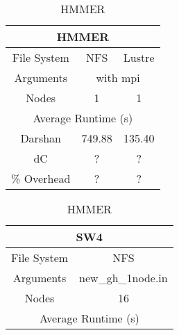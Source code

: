 \begin{table}[h]
    \begin{subtable}[h]{0.22\textwidth}
        \setlength\tabcolsep{3pt}
        \begin{tabular}{|cclcl|}
        \hline
        \multicolumn{5}{|c|}{HMMER}                                                                                  \\ \hline
        \multicolumn{1}{|c|}{File System}      & \multicolumn{2}{c|}{NFS}         & \multicolumn{2}{c|}{Lustre}      \\ \hline
        \multicolumn{1}{|c|}{Arguments}        & \multicolumn{4}{c|}{with mpi}                                       \\ \hline
        \multicolumn{1}{|c|}{Nodes}            & \multicolumn{2}{c|}{1}           & \multicolumn{2}{c|}{1}           \\ \hline
        \multicolumn{5}{|c|}{Average Runtime (s)}                                                                        \\ \hline
        \multicolumn{1}{|c|}{Darshan}          & \multicolumn{2}{c|}{749.88} & \multicolumn{2}{c|}{135.40} \\ \hline
        \multicolumn{1}{|c|}{dC} & \multicolumn{2}{c|}{?}           & \multicolumn{2}{c|}{?}           \\ \hline
        \multicolumn{1}{|c|}{\% Overhead}      & \multicolumn{2}{c|}{?}           & \multicolumn{2}{c|}{?}           \\ \hline
        \end{tabular}
    \caption{HMMER} 
    \label{subtable:HMMER}
\end{subtable}
    \vspace{0.5cm}
    \begin{subtable}[h]{0.2\textwidth}
        \setlength\tabcolsep{2pt}
        \begin{tabular}{|ccl|}
        \hline
        \multicolumn{3}{|c|}{SW4}                                                       \\ \hline
        \multicolumn{1}{|c|}{File System}      & \multicolumn{2}{c|}{NFS}               \\ \hline
        \multicolumn{1}{|c|}{Arguments}        & \multicolumn{2}{c|}{new\_gh\_1node.in} \\ \hline
        \multicolumn{1}{|c|}{Nodes}            & \multicolumn{2}{c|}{16}                \\ \hline
        \multicolumn{3}{|c|}{Average Runtime (s)}                                           \\ \hline

\end{tabular}
\end{subtable}
\end{table}
